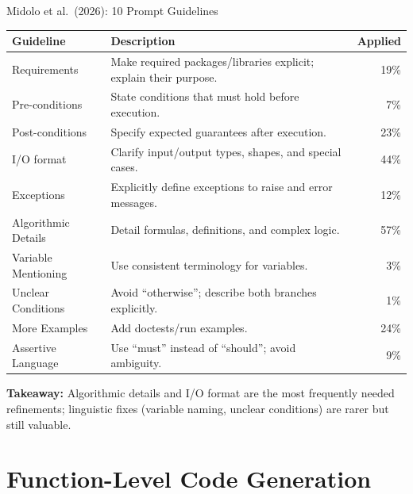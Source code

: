 \documentclass[
11pt,notheorems,hyperref={pdfauthor=whatever}
]{beamer}
\begin{document}
\begin{frame}{Midolo et al.\ (2026): 10 Prompt Guidelines}
	\centering
	\scriptsize
	\begin{tabular}{p{3.2cm}p{6.5cm}r}
		\toprule
		\textbf{Guideline} & \textbf{Description} & \textbf{Applied} \\
		\midrule
		Requirements & Make required packages/libraries explicit; explain their purpose. & 19\% \\
		Pre-conditions & State conditions that must hold before execution. & 7\% \\
		Post-conditions & Specify expected guarantees after execution. & 23\% \\
		I/O format & Clarify input/output types, shapes, and special cases. & 44\% \\
		Exceptions & Explicitly define exceptions to raise and error messages. & 12\% \\
		Algorithmic Details & Detail formulas, definitions, and complex logic. & 57\% \\
		Variable Mentioning & Use consistent terminology for variables. & 3\% \\
		Unclear Conditions & Avoid ``otherwise''; describe both branches explicitly. & 1\% \\
		More Examples & Add doctests/run examples. & 24\% \\
		Assertive Language & Use ``must'' instead of ``should''; avoid ambiguity. & 9\% \\
		\bottomrule
	\end{tabular}

	\vspace{0.25cm}

	\footnotesize
	\textbf{Takeaway:} Algorithmic details and I/O format are the most frequently needed refinements; linguistic fixes (variable naming, unclear conditions) are rarer but still valuable.
\end{frame}


\section{Function-Level Code Generation}
\end{document}

